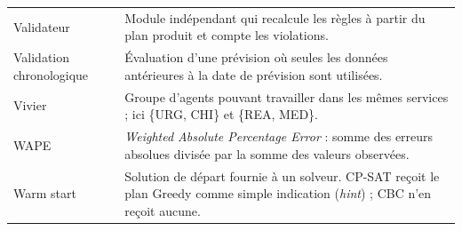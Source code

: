 \begin{longtable}{>{\raggedright\arraybackslash}p{3.6cm} >{\raggedright\arraybackslash}p{11.4cm}}
Validateur & Module indépendant qui recalcule les règles à partir du plan produit et compte les violations. \\
Validation chronologique & Évaluation d'une prévision où seules les données antérieures à la date de prévision sont utilisées. \\
Vivier & Groupe d'agents pouvant travailler dans les mêmes services ; ici \{URG, CHI\} et \{REA, MED\}. \\
WAPE & \textit{Weighted Absolute Percentage Error} : somme des erreurs absolues divisée par la somme des valeurs observées. \\
Warm start & Solution de départ fournie à un solveur. CP-SAT reçoit le plan Greedy comme simple indication (\textit{hint}) ; CBC n'en reçoit aucune. \\
\end{longtable}
\endgroup
